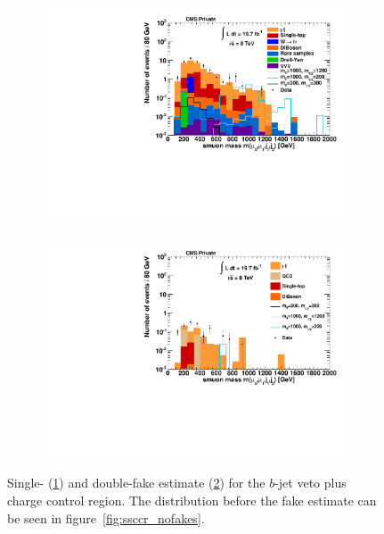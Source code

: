 \begin{figure}[!htbp]
  \centering
  \begin{subfigure}[b]{0.495\textwidth}
    \centering
    \includegraphics[width=\textwidth]{plots/CR6_m_smuon_singlefake.pdf}
    \caption{\label{fig:CRBVC_m_smuon_singlefake}}
  \end{subfigure}
  \begin{subfigure}[b]{0.495\textwidth}
    \centering
    \includegraphics[width=\textwidth]{plots/CR6_m_smuon_doublefake.pdf}
    \caption{\label{fig:CRBVC_m_smuon_doublefake}}
  \end{subfigure}

  \caption{Single- (\ref{fig:CRBVC_m_smuon_singlefake}) and double-fake estimate (\ref{fig:CRBVC_m_smuon_doublefake}) for the $b$-jet veto plus charge control region. The distribution before the fake estimate can be seen in figure~\ref{fig:ssccr_nofakes}.}
  \label{fig:fakeestimates}
\end{figure}

